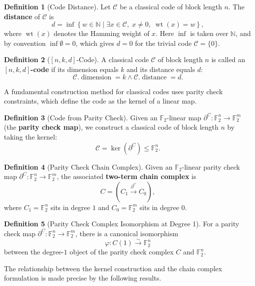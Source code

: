 \documentclass[11pt]{article}
\theoremstyle{plain}
\theoremstyle{definition}
\newtheorem*{definition}{Definition}
\theoremstyle{remark}
\renewcommand{\ker}{\operatorname{ker}}
\begin{document}
\begin{definition}[Code Distance]
Let $\mathcal{C}$ be a classical code of block length $n$. The \textbf{distance} of $\mathcal{C}$ is
\[
d = \inf \left\{ w \in \mathbb{N} \;\big|\; \exists x \in \mathcal{C}, \; x \neq 0, \; \operatorname{wt}(x) = w \right\},
\]
where $\operatorname{wt}(x)$ denotes the Hamming weight of $x$. Here $\inf$ is taken over $\mathbb{N}$, and by convention $\inf \emptyset = 0$, which gives $d = 0$ for the trivial code $\mathcal{C} = \{0\}$.
\end{definition}

\begin{definition}[{$[n,k,d]$-Code}]
A classical code $\mathcal{C}$ of block length $n$ is called an \textbf{$[n, k, d]$-code} if its dimension equals $k$ and its distance equals $d$:
\[
\mathcal{C}.\operatorname{dimension} = k \wedge \mathcal{C}.\operatorname{distance} = d.
\]
\end{definition}

A fundamental construction method for classical codes uses parity check constraints, which define the code as the kernel of a linear map.

\begin{definition}[Code from Parity Check]
Given an $\mathbb{F}_2$-linear map $\partial^C : \mathbb{F}_2^n \to \mathbb{F}_2^m$ (the \textbf{parity check map}), we construct a classical code of block length $n$ by taking the kernel:
\[
\mathcal{C} = \ker(\partial^C) \leq \mathbb{F}_2^n.
\]
\end{definition}

\begin{definition}[Parity Check Chain Complex]
Given an $\mathbb{F}_2$-linear parity check map $\partial^C : \mathbb{F}_2^n \to \mathbb{F}_2^m$, the associated \textbf{two-term chain complex} is
\[
C = \left(C_1 \xrightarrow{\partial^C} C_0\right),
\]
where $C_1 = \mathbb{F}_2^n$ sits in degree $1$ and $C_0 = \mathbb{F}_2^m$ sits in degree $0$.
\end{definition}

\begin{definition}[Parity Check Complex Isomorphism at Degree 1]
For a parity check map $\partial^C : \mathbb{F}_2^n \to \mathbb{F}_2^m$, there is a canonical isomorphism
\[
\varphi : C(1) \xrightarrow{\sim} \mathbb{F}_2^n
\]
between the degree-$1$ object of the parity check complex $C$ and $\mathbb{F}_2^n$.
\end{definition}

The relationship between the kernel construction and the chain complex formulation is made precise by the following results.
\end{document}
